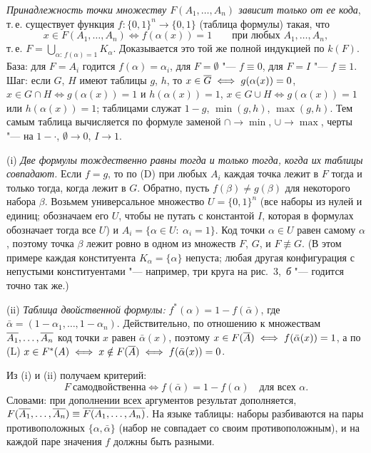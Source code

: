 \begin{solution}[1 (\S\,3)]
\emph{Принадлежность точки множеству $F(A_1,\dots,A_n)$ зависит только от
ее кода}, т.\,е. существует функция $f\colon\{0,1\}^n\to\{0,1\}$ (таблица
формулы) такая, что
\begin{equation*}\tag{D}
x\in F(A_1,\dots,A_n)\iff f(\alpha(x))=1\qquad\text{при любых }A_1,\dots,A_n,
\end{equation*}
т.\,е. $F=\bigcup_{\alpha:\,f(\alpha)=1}K_\alpha$. Доказывается это той же
полной индукцией по $k(F)$. База: для $F=A_i$ годится $f(\alpha)=\alpha_i$,
для $F=\emptyset$ "--- $f\equiv0$, для $F=I$ "--- $f\equiv1$. Шаг: если
$G$, $H$ имеют таблицы $g$, $h$, то $x\in\overline{G}\iff g(\alpha(x))=0$,
$x\in G\cap H\iff g(\alpha(x))=1$ и $h(\alpha(x))=1$,
$x\in G\cup H\iff g(\alpha(x))=1$ или $h(\alpha(x))=1$; таблицами служат
$1-g$, $\min(g,h)$, $\max(g,h)$. Тем самым таблица вычисляется по формуле
заменой $\cap\to\min$, $\cup\to\max$, черты "--- на $1-{\cdot}$,
$\emptyset\to0$, $I\to1$.

(i) \emph{Две формулы тождественно равны тогда и только тогда, когда их
таблицы совпадают.} Если $f=g$, то по (D) при любых $A_i$ каждая точка
лежит в $F$ тогда и только тогда, когда лежит в $G$. Обратно, пусть
$f(\beta)\ne g(\beta)$ для некоторого набора $\beta$. Возьмем
универсальное множество $U=\{0,1\}^n$ (все наборы из нулей и единиц;
обозначаем его $U$, чтобы не путать с константой $I$, которая в формулах
обозначает тогда все $U$) и $A_i=\{\alpha\in U:\ \alpha_i=1\}$. Код точки
$\alpha\in U$ равен самому $\alpha$, поэтому точка $\beta$ лежит ровно в
одном из множеств $F$, $G$, и $F\not\equiv G$. (В этом примере каждая
конституента $K_\alpha=\{\alpha\}$ непуста; любая другая конфигурация с
непустыми конституентами "--- например, три круга на рис.~3,~\emph{б} "---
годится точно так же.)

(ii) \emph{Таблица двойственной формулы:} $f^*(\alpha)=1-f(\bar\alpha)$,
где $\bar\alpha=(1-\alpha_1,\dots,1-\alpha_n)$. Действительно, по отношению
к множествам $\overline{A_1},\dots,\overline{A_n}$ код точки $x$ равен $\bar\alpha(x)$,
поэтому $x\in F(\overline{A})\iff f(\bar\alpha(x))=1$, а по (L)
$x\in F^*(A)\iff x\notin F(\overline{A})\iff f(\bar\alpha(x))=0$.

Из (i) и (ii) получаем критерий:
\begin{equation*}\tag{C}
F\ \text{самодвойственна}\iff f(\bar\alpha)=1-f(\alpha)\quad\text{для всех }\alpha .
\end{equation*}
Словами: при дополнении всех аргументов результат дополняется,
$F(\overline{A_1},\dots,\overline{A_n})\equiv\overline{F(A_1,\dots,A_n)}$. На языке таблицы:
наборы разбиваются на пары противоположных $\{\alpha,\bar\alpha\}$ (набор не
совпадает со своим противоположным), и на каждой паре значения $f$ должны
быть разными.


\end{solution}
